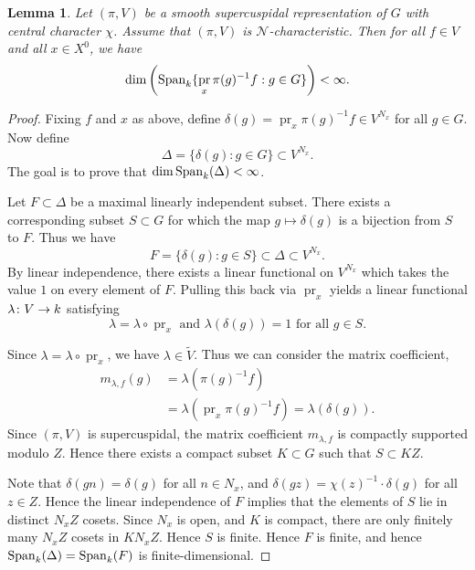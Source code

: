 \documentclass[letter]{amsart}
\newtheorem{lemma}[thm]{Lemma}
\theoremstyle{definition}
\theoremstyle{remark}
\numberwithin{thm}{section}
\numberwithin{equation}{section}
\renewcommand{\NN}{{\mathcal N}}
\DeclareMathOperator{\pr}{pr}
\begin{document}
\begin{lemma}
\label{findim-lemma}
Let $(\pi, V)$ be a smooth supercuspidal representation of $G$ with central character $\chi$.  Assume that $(\pi, V)$ is $\NN$-characteristic.  Then for all $f \in V$ and all $x \in X^0$, we have
$$\dim \left( \Span_k \{ \pr_x \pi(g)^{-1} f : g \in G \} \right) < \infty.$$
\end{lemma}
\begin{proof}
Fixing $f$ and $x$ as above, define $\delta(g) = \pr_x \pi(g)^{-1} f \in V^{N_x}$ for all $g \in G$.  Now define
$$\Delta = \{ \delta(g) : g \in G \} \subset V^{N_x}.$$
The goal is to prove that $\dim \operatorname{Span}_k(\Delta) < \infty$.  

Let $F \subset \Delta$ be a maximal linearly independent subset.  There exists a corresponding subset $S \subset G$ for which the map $g \mapsto \delta(g)$ is a bijection from $S$ to $F$.  Thus we have
$$F = \{ \delta(g) : g \in S \} \subset \Delta \subset V^{N_x}.$$
By linear independence, there exists a linear functional on $V^{N_x}$ which takes the value $1$ on every element of $F$.  Pulling this back via $\pr_x$ yields a linear functional $\lambda \colon V \rightarrow k$ satisfying
$$\lambda = \lambda \circ \pr_x \text{ and } \lambda(\delta(g)) = 1 \text{ for all } g \in S.$$

Since $\lambda = \lambda \circ \pr_x$, we have $\lambda \in \tilde V$.  Thus we can consider the matrix coefficient,
\begin{align*}
m_{\lambda, f}(g) &= \lambda( \pi(g)^{-1} f) \\
&= \lambda( \pr_x \pi(g)^{-1} f) = \lambda(\delta(g)).
\end{align*}
Since $(\pi, V)$ is supercuspidal, the matrix coefficient $m_{\lambda, f}$ is compactly supported modulo $Z$.  Hence there exists a compact subset $K \subset G$ such that $S \subset K Z$.  

Note that $\delta(gn) = \delta(g)$ for all $n \in N_x$, and $\delta(g z) = \chi(z)^{-1} \cdot \delta(g)$ for all $z \in Z$.  Hence the linear independence of $F$ implies that the elements of $S$ lie in distinct $N_x Z$ cosets.  Since $N_x$ is open, and $K$ is compact, there are only finitely many $N_x Z$ cosets in $K N_x Z$.  Hence $S$ is finite.  Hence $F$ is finite, and hence $\operatorname{Span}_k(\Delta) = \operatorname{Span}_k(F)$ is finite-dimensional.  
\end{proof}
  
\end{document}
